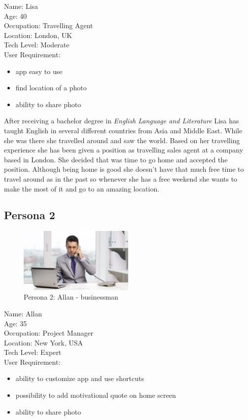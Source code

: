 \documentclass[version=last,fontsize=13pt]{scrartcl}
\begin{document}
\noindent
Name: Lisa \\
Age: 40 \\
Occupation: Travelling Agent \\
Location: London, UK \\
Tech Level: Moderate \\
User Requirement: 
	\begin{itemize}
		\item  app easy to use
		\item  find location of a photo
		\item  ability to share photo 
	\end{itemize}

 After receiving a bachelor degree in \textit{English Language and Literature} Lisa has taught English in several different countries from Asia and Middle East. While she was there she travelled around and saw the world. Based on her travelling experience she has been given a position as travelling sales agent at a company based in London. She decided that was time to go home and accepted the position. Although being home is good she doesn't have that much free time to travel around as in the past so whenever she has a free weekend she wants to make the most of it and go to an amazing location.

\subsection{Persona 2}

\begin{figure}
		
	\centering
	\includegraphics[width = 0.5\textwidth]{imgs/Alan.jpg}
	\caption*{Persona 2: Allan - businessman}


\end{figure}

\noindent
Name: Allan\\
Age: 35\\
Occupation: Project Manager\\
Location: New York, USA\\
Tech Level: Expert\\
User Requirement:
	\begin{itemize}
		\item ability to customize app and use shortcuts
		\item possibility to add motivational quote on home screen
		\item ability to share photo
	\end{itemize}
\end{document}
